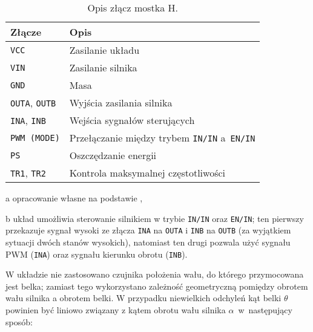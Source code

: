 \begin{table}[H]
    \centering
    \begin{threeparttable}
        \caption{Opis złącz mostka H.}
        \label{tab:zlacza_mostka_H}
        
        \begin{tabularx}{0.67\textwidth}{l | l}
            \toprule
            Złącze & Opis \\
            \midrule
            \texttt{VCC} & Zasilanie układu \\
            \texttt{VIN} & Zasilanie silnika \\
            \texttt{GND} & Masa \\
            \texttt{OUTA}, \texttt{OUTB} & Wyjścia zasilania silnika \\
            \texttt{INA}, \texttt{INB} & Wejścia sygnałów sterujących \\
            \texttt{PWM (MODE)} & Przełączanie między trybem \texttt{IN/IN} a~\texttt{EN/IN}\tnote{b} \\
            \texttt{PS} & Oszczędzanie energii \\
            \texttt{TR1}, \texttt{TR2} & Kontrola maksymalnej częstotliwości \\
            \bottomrule
        \end{tabularx}
        
        \begin{tablenotes}
            \footnotesize
            \item[a] opracowanie własne na podstawie \cite{MOSTEK_H_MANUAL},
            \item[b] układ umożliwia sterowanie silnikiem w trybie \texttt{IN/IN} oraz \texttt{EN/IN}; ten pierwszy przekazuje sygnał wysoki ze złącza \texttt{INA} na \texttt{OUTA} i \texttt{INB} na \texttt{OUTB} (za wyjątkiem sytuacji dwóch stanów wysokich), natomiast ten drugi pozwala użyć sygnału PWM (\texttt{INA}) oraz sygnału kierunku obrotu (\texttt{INB}).
        \end{tablenotes}
    \end{threeparttable}
\end{table}

W układzie nie zastosowano czujnika położenia wału, do którego przymocowana jest belka; zamiast tego wykorzystano zależność geometryczną pomiędzy obrotem wału silnika a obrotem belki. W przypadku niewielkich odchyleń kąt belki $\theta$ powinien być liniowo związany z kątem obrotu wału silnika $\alpha$~w~następujący sposób:

